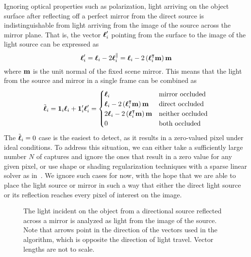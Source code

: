Ignoring optical properties such as polarization, light arriving on the object
surface after reflecting off a perfect mirror from the direct source is
indistinguishable from light arriving from the image of the source across the
mirror plane. That is, the vector $\boldsymbol{\ell}_i'$ pointing from the surface to the
image of the light source can be expressed as
\begin{equation} \label{eq:light-reflection}
  \boldsymbol{\ell}_i' = \boldsymbol{\ell}_i - 2 \boldsymbol{\ell}_i^\parallel
            = \boldsymbol{\ell}_i - 2 \left(\boldsymbol{\ell}_i^\intercal \mathbf{m}\right) \mathbf{m}
\end{equation}
where $\mathbf{m}$ is the unit normal of the fixed scene mirror. This means that
the light from the source and mirror in a single frame can be
combined as
\begin{equation} \label{eq:combinations}
  \tilde{\boldsymbol{\ell}}_i = \mathbf{1}_i \boldsymbol{\ell}_i + \mathbf{1}_i' \boldsymbol{\ell}_i'
                   = \begin{cases}
    \boldsymbol{\ell}_i                                                       & \textrm{mirror occluded} \\
    \boldsymbol{\ell}_i - 2 \left(\boldsymbol{\ell}_i^\intercal \mathbf{m}\right) \mathbf{m}   & \textrm{direct occluded} \\
    2 \boldsymbol{\ell}_i - 2 \left(\boldsymbol{\ell}_i^\intercal \mathbf{m}\right) \mathbf{m} & \textrm{neither occluded} \\
    0                                                              & \textrm{both occluded}
  \end{cases}
\end{equation}
The $\tilde{\boldsymbol{\ell}}_i = 0$ case is the easiest to detect, as it results in a
zero-valued pixel under ideal conditions. To address this situation, we can
either take a sufficiently large number $N$ of captures and ignore the ones
that result in a zero value for any given pixel, or use shape or shading
regularization techniques with a sparse linear solver as in~\cite{hernandez}.
We ignore such cases for now, with the hope that we are able to place the light
source or mirror in such a way that either the direct light source or its
reflection reaches every pixel of interest on the image.
\begin{figure}
  
  \caption{The light incident on the object from a directional source reflected
  across a mirror is analyzed as light from the image of the source. Note that
  arrows point in the direction of the vectors used in the algorithm, which is
  opposite the direction of light travel. Vector lengths are not to
  scale.}\label{fig:light-reflection}
\end{figure}
